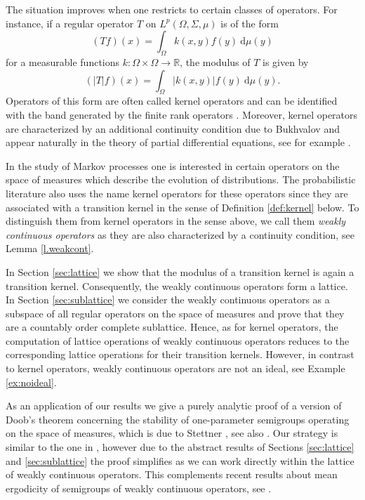 \documentclass{amsart}
\numberwithin{equation}{section}
\theoremstyle{remark}
\theoremstyle{definition}
\begin{document}
The situation improves when one restricts to certain classes of operators. For instance, if
a regular operator $T$ on $L^p(\Omega,\Sigma,\mu)$ is of the form
\[ (Tf)(x) = \int_\Omega k(x,y)f(y) {\:\mathrm{d}}\mu(y) \]
for a measurable functions $k:\Omega\times\Omega \to {\mathds{R}}$,
the modulus of $T$ is given by
\[ (\lvert T\rvert f)(x) = \int_\Omega \lvert k(x,y)\rvert f(y) {\:\mathrm{d}}\mu(y).\]
Operators of this form are often called kernel operators and can be identified with the
band generated by the finite rank operators \cite[Prop IV.9.6]{schaefer1974}.
Moreover, kernel operators are characterized by an additional continuity condition due to Bukhvalov \cite{bukhvalov1978}
and appear naturally in the theory of partial differential equations, see for example \cite{ouhabaz2005}.

In the study of Markov processes one is interested in certain operators on the space of measures which describe the evolution
of distributions.
The probabilistic literature also uses the name kernel operators for these operators since they are 
associated with a transition kernel in the sense of Definition \ref{def:kernel} below.
To distinguish them from kernel operators in the sense above, we call them 
\emph{weakly continuous operators} as they are also characterized by a continuity condition, see Lemma \ref{l.weakcont}.

In Section \ref{sec:lattice} we show that the modulus of a transition kernel is again a transition kernel.
Consequently, the weakly continuous operators form a lattice.
In Section \ref{sec:sublattice} we consider the weakly continuous operators as a subspace of all regular operators on the space
of measures and prove that they are a countably order complete sublattice.
Hence, as for kernel operators, the computation of lattice operations of weakly continuous operators reduces
to the corresponding lattice operations for their transition kernels.
However, in contrast to kernel operators, weakly continuous operators are not an ideal, see Example \ref{ex:noideal}.

As an application of our results we give a purely analytic proof of a version of Doob's theorem
concerning the stability of one-parameter semigroups operating 
on the space of measures, which is due to Stettner \cite[Thm 1]{stettner1994},
see also \cite{seidler1997}. 
Our strategy is similar to the one in \cite{gerlach2012}, however due to the abstract results of Sections \ref{sec:lattice}
and \ref{sec:sublattice}
the proof simplifies as we can work directly within the lattice of weakly continuous operators.
This complements recent results about mean ergodicity of semigroups of weakly continuous operators, see \cite{gerlach2013}.
\end{document}
